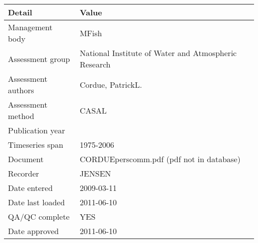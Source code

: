 \begin{table}[htb]
\centering
\begin{tabular}{lp{7cm}}
\toprule
Detail & Value \\
\midrule
Management body    & MFish                                                \\
Assessment group   & National Institute of Water and Atmospheric Research \\
Assessment authors & Cordue, PatrickL.                                    \\
Assessment method  & CASAL                                                \\
Publication year   &                                                      \\
Timeseries span    & 1975-2006                                            \\
Document           & CORDUEperscomm.pdf (pdf not in database)             \\
Recorder           & JENSEN                                               \\
Date entered       & 2009-03-11                                           \\
Date last loaded   & 2011-06-10                                           \\
QA/QC complete     & YES                                                  \\
Date approved      & 2011-06-10                                           \\
\bottomrule
\end{tabular}
\label{tab:assessdet}
\end{table}
